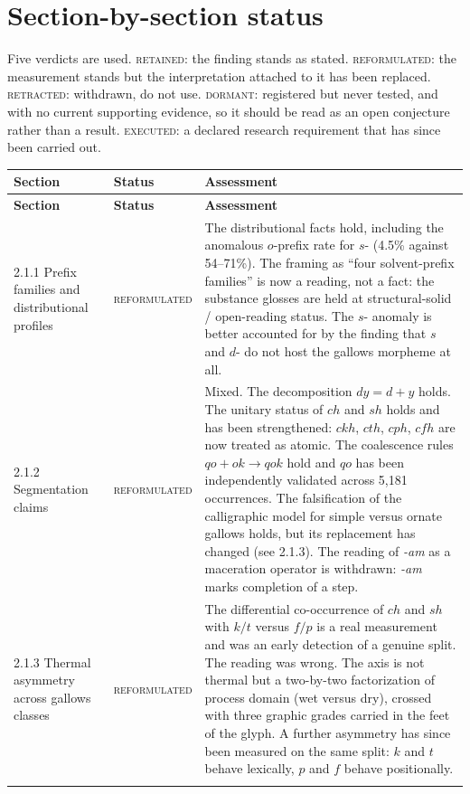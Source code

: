 \documentclass[11pt,a4paper]{article}
\newcommand{\keep}{\textsc{retained}}
\newcommand{\reform}{\textsc{reformulated}}
\newcommand{\retract}{\textcolor{red!65!black}{\textsc{retracted}}}
\newcommand{\dormant}{\textsc{dormant}}
\newcommand{\executed}{\textcolor{green!35!black}{\textsc{executed}}}
\begin{document}
\section{Section-by-section status}

Five verdicts are used. \keep{}: the finding stands as stated. \reform{}: the measurement stands
but the interpretation attached to it has been replaced. \retract{}: withdrawn, do not use.
\dormant{}: registered but never tested, and with no current supporting evidence, so it should be
read as an open conjecture rather than a result. \executed{}: a declared research requirement that
has since been carried out.

\begin{longtable}{@{}p{4.9cm}p{2.4cm}p{7.6cm}@{}}
\toprule
\textbf{Section} & \textbf{Status} & \textbf{Assessment} \\
\midrule
\endfirsthead
\toprule
\textbf{Section} & \textbf{Status} & \textbf{Assessment} \\
\midrule
\endhead
\bottomrule
\endfoot

2.1.1 Prefix families and distributional profiles & \reform{} &
The distributional facts hold, including the anomalous $o$-prefix rate for $s$- (4.5\% against
54--71\%). The framing as ``four solvent-prefix families'' is now a reading, not a fact: the
substance glosses are held at structural-solid / open-reading status. The $s$- anomaly is better
accounted for by the finding that $s$ and $d$- do not host the gallows morpheme at all. \\
\addlinespace

2.1.2 Segmentation claims & \reform{} &
Mixed. The decomposition $dy = d+y$ holds. The unitary status of $ch$ and $sh$ holds and has been
strengthened: $ckh$, $cth$, $cph$, $cfh$ are now treated as atomic. The coalescence rules
$qo + ok \rightarrow qok$ hold and $qo$ has been independently validated across 5{,}181
occurrences. The falsification of the calligraphic model for simple versus ornate gallows holds,
but its replacement has changed (see 2.1.3). The reading of \textit{-am} as a maceration operator
is withdrawn: \textit{-am} marks completion of a step. \\
\addlinespace

2.1.3 Thermal asymmetry across gallows classes & \reform{} &
The differential co-occurrence of $ch$ and $sh$ with $k/t$ versus $f/p$ is a real measurement and
was an early detection of a genuine split. The reading was wrong. The axis is not thermal but a
two-by-two factorization of process domain (wet versus dry), crossed with three graphic grades
carried in the feet of the glyph. A further asymmetry has since been measured on the same split:
$k$ and $t$ behave lexically, $p$ and $f$ behave positionally. \\
\addlinespace


\end{longtable}
\end{document}
